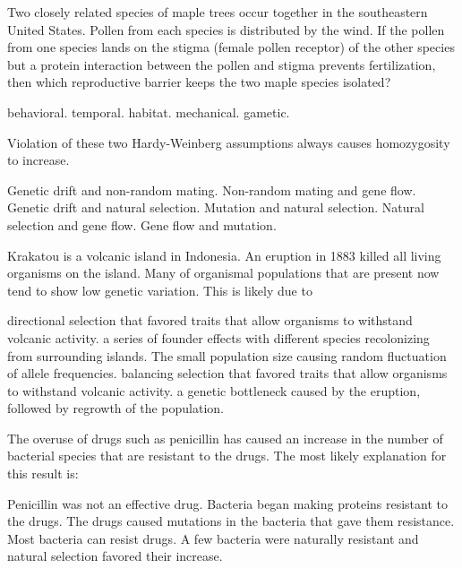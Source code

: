 
\question
Two closely related species of maple trees occur together in the southeastern United States.  Pollen from each species is distributed by the wind.  If the pollen from one species lands on the stigma (female pollen receptor) of the other species but a protein interaction between the pollen and stigma prevents fertilization, then which reproductive barrier keeps the two maple species isolated?

\begin{choices}
\choice behavioral.
\choice temporal.
\choice habitat.
\choice mechanical.
\correctchoice gametic.
\end{choices}

\question
Violation of these two Hardy-Weinberg assumptions always causes homozygosity to increase.

\begin{choices}
\correctchoice Genetic drift and non-random mating.
\choice Non-random mating and gene flow.
\choice Genetic drift and natural selection.
\choice Mutation and natural selection.
\choice Natural selection and gene flow.
\choice Gene flow and mutation.
\end{choices}

\question
Krakatou is a volcanic island in Indonesia.  An eruption in 1883 killed all living organisms on the island.  Many of organismal populations that are present now tend to show low genetic variation.  This is likely due to

\begin{choices}
\choice directional selection that favored traits that allow organisms to withstand volcanic activity. 
\correctchoice a series of founder effects with different species recolonizing from surrounding islands. 
\choice The small population size causing random fluctuation of allele frequencies. 
\choice balancing selection that favored traits that allow organisms to withstand volcanic activity. 
\choice a genetic bottleneck caused by the eruption, followed by regrowth of the population. 
\end{choices}

\question
The overuse of drugs such as penicillin has caused an increase in the number of bacterial species that are resistant to the drugs. The most likely explanation for this result is:

\begin{choices}
\choice Penicillin was not an effective drug. 
\choice Bacteria began making proteins resistant to the drugs. 
\choice The drugs caused mutations in the bacteria that gave them resistance. 
\choice Most bacteria can resist drugs. 
\correctchoice A few bacteria were naturally resistant and natural selection favored their increase. 
\end{choices}

